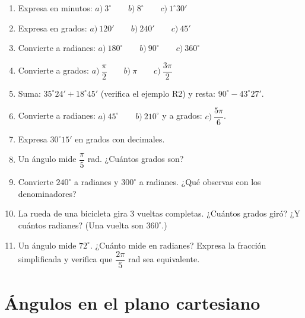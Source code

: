\documentclass[12pt, letterpaper]{article}
\begin{document}
\begin{enumerate}[leftmargin=*, resume]
  \item \facil{} Expresa en minutos: $a)\ 3^{\circ} \qquad b)\ 8^{\circ} \qquad c)\ 1^{\circ} 30'$

  \item \facil{} Expresa en grados: $a)\ 120' \qquad b)\ 240' \qquad c)\ 45'$

  \item \facil{} Convierte a radianes: $a)\ 180^{\circ} \qquad b)\ 90^{\circ} \qquad c)\ 360^{\circ}$

  \item \facil{} Convierte a grados: $a)\ \dfrac{\pi}{2} \qquad b)\ \pi \qquad c)\ \dfrac{3\pi}{2}$

  \item \medio{} Suma: $35^{\circ} 24' + 18^{\circ} 45'$ (verifica el ejemplo R2) y resta: $90^{\circ} - 43^{\circ} 27'$.

  \item \medio{} Convierte a radianes: $a)\ 45^{\circ} \qquad b)\ 210^{\circ}$ y a grados: $c)\ \dfrac{5\pi}{6}$.

  \item \medio{} Expresa $30^{\circ} 15'$ en grados con decimales.

  \item \medio{} Un ángulo mide $\dfrac{\pi}{5}$ rad. ¿Cuántos grados son?

  \item \dificil{} Convierte $240^{\circ}$ a radianes y $300^{\circ}$ a radianes. ¿Qué observas con los denominadores?

  \item \dificil{} La rueda de una bicicleta gira $3$ vueltas completas. ¿Cuántos grados giró? ¿Y cuántos radianes? (Una vuelta son $360^{\circ}$.)

  \item \dificil{} Un ángulo mide $72^{\circ}$. ¿Cuánto mide en radianes? Expresa la fracción simplificada y verifica que $\dfrac{2\pi}{5}$ rad sea equivalente.
\end{enumerate}

\newpage

\section{Ángulos en el plano cartesiano}
\end{document}
